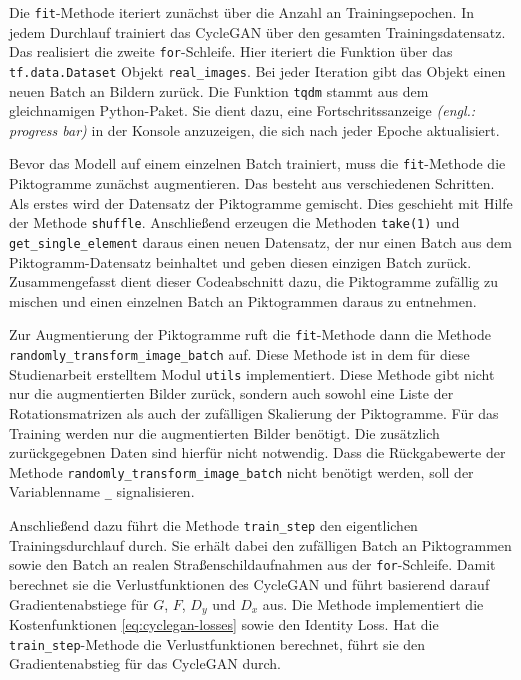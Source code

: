 Die \texttt{fit}-Methode iteriert zunächst über die Anzahl an Trainingsepochen. In jedem Durchlauf trainiert das \ac{CycleGAN} über den gesamten Trainingsdatensatz. Das realisiert die zweite \texttt{for}-Schleife. Hier iteriert die Funktion über das \texttt{tf.data.Dataset} Objekt \texttt{real_images}. Bei jeder Iteration gibt das Objekt einen neuen Batch an Bildern zurück. Die Funktion \texttt{tqdm} stammt aus dem gleichnamigen Python-Paket. Sie dient dazu, eine Fortschritssanzeige \emph{(engl.: progress bar)} in der Konsole anzuzeigen, die sich nach jeder Epoche aktualisiert.

Bevor das Modell auf einem einzelnen Batch trainiert, muss die \texttt{fit}-Methode die Piktogramme zunächst augmentieren. Das besteht aus verschiedenen Schritten. Als erstes wird der Datensatz der Piktogramme gemischt. Dies geschieht mit Hilfe der Methode \texttt{shuffle}. Anschließend erzeugen die Methoden \texttt{take(1)} und \texttt{get_single_element} daraus einen neuen Datensatz, der nur einen Batch aus dem Piktogramm-Datensatz beinhaltet und geben diesen einzigen Batch zurück. Zusammengefasst dient dieser Codeabschnitt dazu, die Piktogramme zufällig zu mischen und einen einzelnen Batch an Piktogrammen daraus zu entnehmen.

Zur Augmentierung der Piktogramme ruft die \texttt{fit}-Methode dann die Methode \texttt{randomly_transform_image_batch} auf. Diese Methode ist in dem für diese Studienarbeit erstelltem Modul \texttt{utils} implementiert. Diese Methode gibt nicht nur die augmentierten Bilder zurück, sondern auch sowohl eine Liste der Rotationsmatrizen als auch der zufälligen Skalierung der Piktogramme. Für das Training werden nur die augmentierten Bilder benötigt. Die zusätzlich zurückgegebnen Daten sind hierfür nicht notwendig. Dass die Rückgabewerte der Methode \texttt{randomly_transform_image_batch} nicht benötigt werden, soll der Variablenname \texttt{_} signalisieren.

Anschließend dazu führt die Methode \texttt{train_step} den eigentlichen Trainingsdurchlauf durch. Sie erhält dabei den zufälligen Batch an Piktogrammen sowie den Batch an realen Straßenschildaufnahmen aus der \texttt{for}-Schleife. Damit berechnet sie die Verlustfunktionen des \ac{CycleGAN} und führt basierend darauf Gradientenabstiege für $G$, $F$, $D_y$ und $D_x$ aus. Die Methode implementiert die Kostenfunktionen \ref{eq:cyclegan-losses} sowie den Identity Loss. Hat die \texttt{train_step}-Methode die Verlustfunktionen berechnet, führt sie den Gradientenabstieg für das \ac{CycleGAN} durch.

